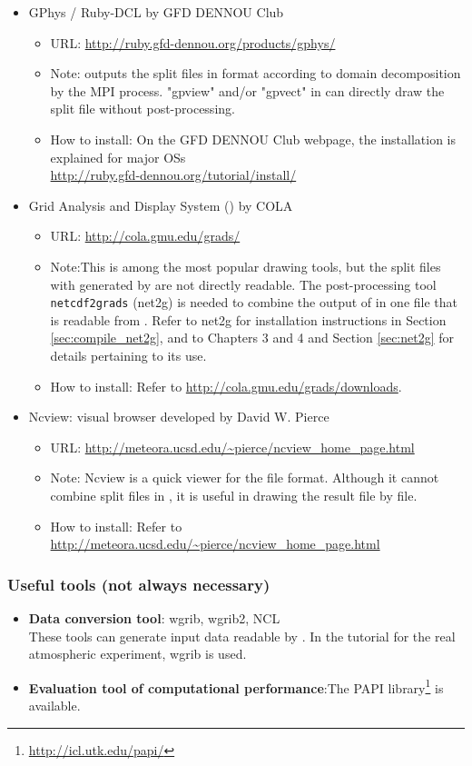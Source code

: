 \begin{itemize}
\item GPhys / Ruby-DCL by GFD DENNOU Club
 \begin{itemize}
  \item URL: \url{http://ruby.gfd-dennou.org/products/gphys/}
  \item Note: \scalelib outputs the split files
  in {\netcdf} format according to domain decomposition by the MPI process.
  "gpview" and/or "gpvect" in {\gphys} can directly draw the split file without post-processing.
  \item How to install:
  On the GFD DENNOU Club webpage, the installation is explained for major OSs\\
  \url{http://ruby.gfd-dennou.org/tutorial/install/}\\
   \end{itemize}
\item Grid Analysis and Display System (\grads) by COLA
 \begin{itemize}
  \item URL: \url{http://cola.gmu.edu/grads/}
  \item Note:This is among the most popular drawing tools,
  but the split files with {\netcdf} generated by \scalelib are not directly readable.
  The post-processing tool \verb|netcdf2grads| (net2g) is needed to combine the output of \scalelib in one file that is readable from \grads. Refer to net2g for installation instructions in Section \ref{sec:compile_net2g}, and to Chapters 3 and 4 and Section \ref{sec:net2g} for details pertaining to its use.
  \item How to install: Refer to \url{http://cola.gmu.edu/grads/downloads}.
 \end{itemize}
\item Ncview: {\netcdf} visual browser developed by David W. Pierce
 \begin{itemize}
  \item URL: \url{http://meteora.ucsd.edu/~pierce/ncview_home_page.html}
  \item Note: Ncview is a quick viewer for the {\netcdf} file format.
  Although it cannot combine split files in \scalelib, it is useful in drawing the result file by file.
  \item How to install: Refer to \url{http://meteora.ucsd.edu/~pierce/ncview_home_page.html}
 \end{itemize}
\end{itemize}


\subsubsection{Useful tools (not always necessary)}
\begin{itemize}
  \item {\bf Data conversion tool}: wgrib, wgrib2, NCL\\
  These tools can generate input data readable by \scalerm.
  In the tutorial for the real atmospheric experiment, wgrib is used.
  \item {\bf Evaluation tool of computational performance}:The PAPI library\footnote{\url{http://icl.utk.edu/papi/}} is available.
\end{itemize}
